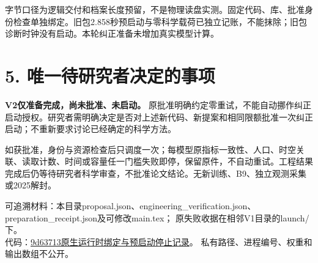 \documentclass[UTF8,a4paper,10pt,fontset=none]{ctexart}
\newcommand{\key}[1]{\textcolor{ink}{\textbf{#1}}}
\begin{document}
字节口径为逻辑交付和档案长度预留，不是物理读盘实测。固定代码、库、批准身份检查单独绑定。旧包2.858秒预启动与零科学载荷已独立记账，不能抹除；旧包诊断时钟没有启动。本轮纠正准备未增加真实模型计算。

\section*{5. 唯一待研究者决定的事项}
\key{V2仅准备完成，尚未批准、未启动。}
原批准明确约定零重试，不能自动挪作纠正启动授权。研究者需明确决定是否对上述新代码、新提案和相同限额批准一次纠正启动；不重新要求讨论已经确定的科学方法。

如获批准，身份与资源检查后只调度一次；每模型原指标一致性、人口、时空关联、读取计数、时间或容量任一门槛失败即停，保留原件，不自动重试。工程结果完成后仍等待研究者科学审查，不批准论文结论。无新训练、B9、独立观测采集或2025解封。

{\footnotesize
可追溯材料：本目录proposal.json、engineering\_verification.json、preparation\_receipt.json及可修改main.tex；
原失败收据在相邻V1目录的launch/下。\\
代码：\href{https://github.com/flyeagle-cex/YunTAPR-Net/commit/9d63713ad7777e1624f1cc87502f97b571e95df4}{9d63713原生运行时绑定与预启动停止记录}。
私有路径、进程编号、权重和输出数组不公开。}
\end{document}
